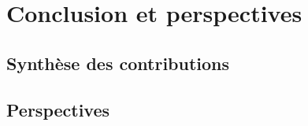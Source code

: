 
\chapter{Conclusion et perspectives}\label{chap:conclusion}

\section{Synthèse des contributions}

\section{Perspectives}
